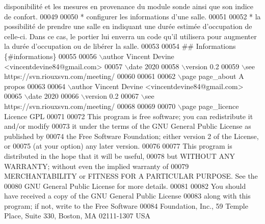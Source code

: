 \begin{DoxyCode}
       disponibilité et les mesures en provenance du module sonde ainsi que son indice de confort.
00049 
00050 * configurer les informations d'une salle.
00051 
00052 * la possibilité de prendre une salle en indiquant une durée estimée d'occupation de celle-ci. Dans ce
       cas, le portier lui enverra un code qu'il utilisera pour augmenter la durée d'occupation ou de libérer la
       salle.
00053 
00054 ## Informations \{#informations\}
00055 
00056 \(\backslash\)author Vincent Devine <vincentdevine84@gmail.com>
00057 \(\backslash\)date 2020
00058 \(\backslash\)version 0.2
00059 \(\backslash\)see https://svn.riouxsvn.com/meeting/
00060 
00061 
00062 \(\backslash\)page page\_about A propos
00063 
00064 \(\backslash\)author Vincent Devine <vincentdevine84@gmail.com>
00065 \(\backslash\)date 2020
00066 \(\backslash\)version 0.2
00067 \(\backslash\)see https://svn.riouxsvn.com/meeting/
00068 
00069 
00070 \(\backslash\)page page\_licence Licence GPL
00071 
00072 This program is free software; you can redistribute it and/or modify
00073 it under the terms of the GNU General Public License as published by
00074 the Free Software Foundation; either version 2 of the License, or
00075 (at your option) any later version.
00076 
00077 This program is distributed in the hope that it will be useful,
00078 but WITHOUT ANY WARRANTY; without even the implied warranty of
00079 MERCHANTABILITY or FITNESS FOR A PARTICULAR PURPOSE. See the
00080 GNU General Public License for more details.
00081 
00082 You should have received a copy of the GNU General Public License
00083 along with this program; if not, write to the Free Software
00084 Foundation, Inc., 59 Temple Place, Suite 330, Boston, MA 02111-1307 USA
\end{DoxyCode}
